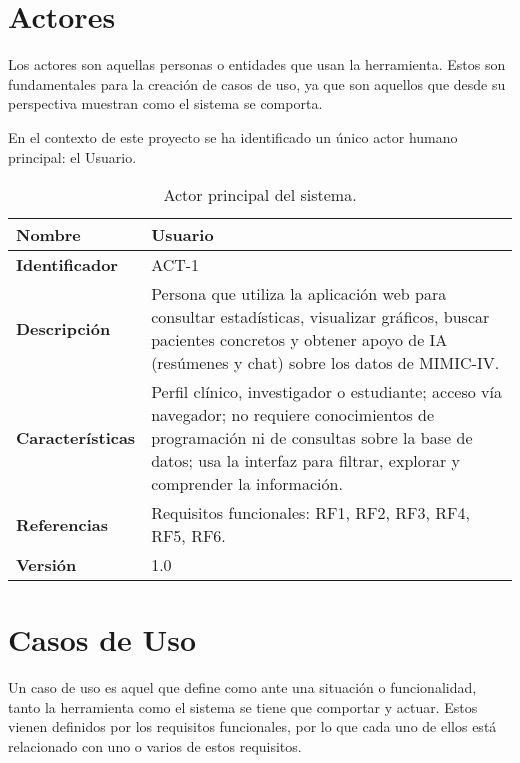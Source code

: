 \section{Actores}

Los actores son aquellas personas o entidades que usan la herramienta. Estos son fundamentales para la creación de casos de uso, ya que son aquellos que desde su perspectiva muestran como el sistema se comporta. 

En el contexto de este proyecto se ha identificado un único actor humano principal: el Usuario. 

\begin{table}[H]
    \centering
    \begin{tabular}{|l|p{11cm}|}
        \hline
        \textbf{Nombre} & Usuario \\
        \hline
        \textbf{Identificador} & ACT-1 \\
        \hline
        \textbf{Descripción} & Persona que utiliza la aplicación web para consultar estadísticas, visualizar gráficos, buscar pacientes concretos y obtener apoyo de IA (resúmenes y chat) sobre los datos de MIMIC-IV. \\
        \hline
        \textbf{Características} & Perfil clínico, investigador o estudiante; acceso vía navegador; no requiere conocimientos de programación ni de consultas sobre la base de datos; usa la interfaz para filtrar, explorar y comprender la información. \\
        \hline
        \textbf{Referencias} & Requisitos funcionales: RF1, RF2, RF3, RF4, RF5, RF6. \\
        \hline
        \textbf{Versión} & 1.0 \\
        \hline
    \end{tabular}
    \caption{Actor principal del sistema.}
\end{table}


\section{Casos de Uso}

Un caso de uso es aquel que define como ante una situación o funcionalidad, tanto la herramienta como el sistema se tiene que comportar y actuar. Estos vienen definidos por los requisitos funcionales, por lo que cada uno de ellos está relacionado con uno o varios de estos requisitos.


